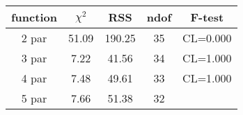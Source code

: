 \begin{tabular}{c|c|c|c|c}
function & $\chi^2$ & RSS & ndof & F-test \\
\hline
2 par & 51.09 & 190.25 & 35 & CL=0.000 \\
3 par & 7.22 & 41.56 & 34 & CL=1.000 \\
4 par & 7.48 & 49.61 & 33 & CL=1.000 \\
5 par & 7.66 & 51.38 & 32 & \\
\hline
\end{tabular}